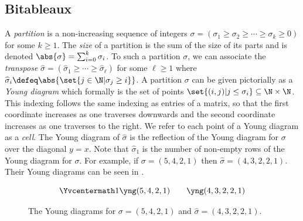 \documentclass[letterpaper, 11pt]{amsart}
\begin{document}
\subsection{Bitableaux}\label{sec:bitab}

\begin{defn}\label{defn:partitions}
    A \emph{partition} is a non-increasing sequence of integers $\sigma = (\sigma_1 \geq \sigma_2 \geq \cdots \geq \sigma_k \geq 0)$ for some $k \geq 1$.
    The \emph{size} of a partition is the sum of the size of its parts and is denoted $\abs{\sigma} = \sum_{i = 0}^k \sigma_i$.    
    To such a partition $\sigma$, we can associate the \emph{transpose} $\widehat{\sigma} = (\widehat{\sigma}_1 \geq \cdots \geq \widehat{\sigma}_\ell)$ for some $\ell \geq 1$ where $\widehat{\sigma}_i \defeq \abs{\set{j \in \N | \sigma_j \geq i}}$.
    A partition $\sigma$ can be given pictorially as a \emph{Young diagram} which formally is the set of points $\set{(i, j) | j \leq \sigma_i} \subseteq \N \times \N$.
    This indexing follows the same indexing as entries of a matrix, so that the first coordinate increases as one traverses downwards and the second coordinate increases as one traverses to the right.
    We refer to each point of a Young diagram as a \emph{cell}.
    The Young diagram of $\widehat{\sigma}$ is the reflection of the Young diagram for $\sigma$ over the diagonal $y = x$.
    Note that $\widehat{\sigma}_1$ is the number of non-empty rows of the Young diagram for $\sigma$.
    For example, if $\sigma = (5, 4, 2, 1)$ then $\widehat{\sigma} = (4, 3, 2, 2, 1)$.
    Their Young diagrams can be seen in .

    \begin{figure}[H]
        \centering
        \[
            \Yvcentermath1 \yng(5,4,2,1) \qquad \yng(4,3,2,2,1)
        \]
        \caption{
          The Young diagrams for $\sigma = (5, 4, 2, 1)$ and $\widehat{\sigma} = (4, 3, 2, 2, 1)$.
        }\label{fig:young_diagram_ex}
    \end{figure}
\end{defn}
\end{document}
